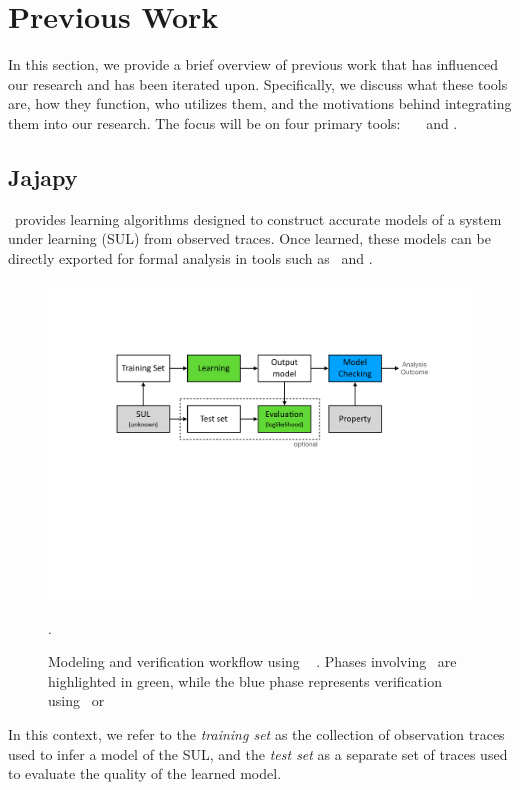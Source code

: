 \section{Previous Work}\label{sec:jajapy_and_cupaal}
In this section, we provide a brief overview of previous work that has influenced our research and has been iterated upon.
Specifically, we discuss what these tools are, how they function, who utilizes them, and the motivations behind integrating them into our research.
The focus will be on four primary tools: \Prism\, \Storm\, \Jajapy\ and \Cupaal.


\subsection{Jajapy}\label{sec:jajapy}
\Jajapy\ provides learning algorithms designed to construct accurate models of a system under learning (SUL) from observed traces.
Once learned, these models can be directly exported for formal analysis in tools such as \Storm~and \Prism.


\begin{figure}
    \centering
    \includegraphics[width=\columnwidth]{figures/workflow.pdf}
    \caption{Modeling and verification workflow using \Jajapy~ \cite{jajapygithub}. Phases involving \Jajapy\ are highlighted in green, while the blue phase represents verification using \Storm~or \Prism}.
    \label{fig:workflow}
\end{figure}


In this context, we refer to the \textit{training set} as the collection of observation traces used to infer a model of the SUL, and the \textit{test set} as a separate set of traces used to evaluate the quality of the learned model.


